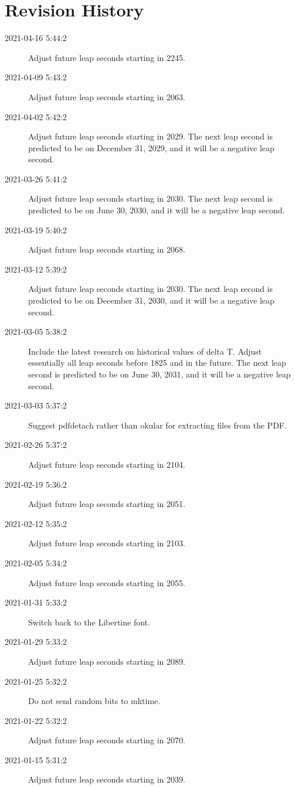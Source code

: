 \documentclass[letterpaper,twoside]{article}
\begin{document}
\section{Revision History}

\begin{description}
\item[2021-04-16 5:44:2]Adjust future leap seconds starting in 2245.
\item[2021-04-09 5:43:2]Adjust future leap seconds starting in 2063.
\item[2021-04-02 5:42:2]Adjust future leap seconds starting in 2029.
  The next leap second is predicted to be on December 31, 2029, and
  it will be a negative leap second.
\item[2021-03-26 5:41:2]Adjust future leap seconds starting in 2030.
  The next leap second is predicted to be on June 30, 2030, and
  it will be a negative leap second.
\item[2021-03-19 5:40:2]Adjust future leap seconds starting in 2068.
\item[2021-03-12 5:39:2]Adjust future leap seconds starting in 2030.
  The next leap second is predicted to be on December 31, 2030,
  and it will be a negative leap second.
\item[2021-03-05 5:38:2]Include the latest research on historical values
  of delta T.  Adjust essentially all leap seconds before 1825 and
  in the future.  The next leap second is predicted to be on June 30, 2031,
  and it will be a negative leap second.
\item[2021-03-03 5:37:2]Suggest pdfdetach rather than okular
  for extracting files from the PDF.
\item[2021-02-26 5:37:2]Adjust future leap seconds starting in 2104.
\item[2021-02-19 5:36:2]Adjust future leap seconds starting in 2051.
\item[2021-02-12 5:35:2]Adjust future leap seconds starting in 2103.
\item[2021-02-05 5:34:2]Adjust future leap seconds starting in 2055.
\item[2021-01-31 5:33:2]Switch back to the Libertine font.
\item[2021-01-29 5:33:2]Adjust future leap seconds starting in 2089.
\item[2021-01-25 5:32:2]Do not send random bits to mktime.
\item[2021-01-22 5:32:2]Adjust future leap seconds starting in 2070.
\item[2021-01-15 5:31:2]Adjust future leap seconds starting in 2039.

\end{description}
\end{document}
